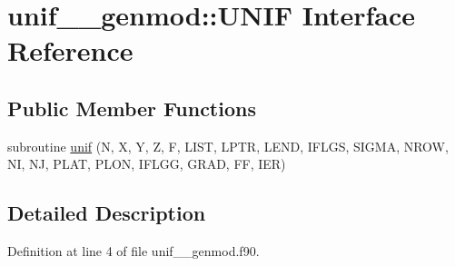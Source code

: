 \hypertarget{interfaceunif____genmod_1_1UNIF}{\section{unif\+\_\+\+\_\+genmod\+:\+:U\+N\+I\+F Interface Reference}
\label{interfaceunif____genmod_1_1UNIF}
}
\subsection*{Public Member Functions}
\begin{DoxyCompactItemize}
\item 
subroutine \hyperlink{interfaceunif____genmod_1_1UNIF_a921819038977590e467cc07c5ce5513b}{unif} (N, X, Y, Z, F, L\+I\+S\+T, L\+P\+T\+R, L\+E\+N\+D, I\+F\+L\+G\+S, S\+I\+G\+M\+A, N\+R\+O\+W, N\+I, N\+J, P\+L\+A\+T, P\+L\+O\+N, I\+F\+L\+G\+G, G\+R\+A\+D, F\+F, I\+E\+R)
\end{DoxyCompactItemize}


\subsection{Detailed Description}


Definition at line 4 of file unif\+\_\+\+\_\+genmod.\+f90.



